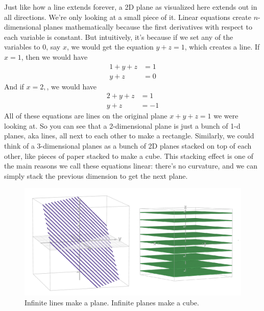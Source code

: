 \documentclass[12pt]{scrartcl}
\begin{document}
Just like how a line extends forever, a 2D plane as visualized here extends out in all directions. We're only looking at a small piece of it. Linear equations create $n$-dimensional planes mathematically because the first derivatives with respect to each variable is constant. But intuitively, it's because if we set any of the variables to 0, say $x$, we would get the equation $y+z = 1$, which creates a line. If $x=1$, then we would have
\begin{align*}
    1 + y + z &= 1 \\
        y + z &= 0
\end{align*}
And if $x=2,$, we would have
\begin{align*}
    2 + y + z &= 1 \\
        y + z &= -1
\end{align*}
All of these equations are lines on the original plane $x+y+z=1$ we were looking at. So you can see that a 2-dimensional plane is just a bunch of 1-d planes, aka lines, all next to each other to make a rectangle. Similarly, we could think of a 3-dimensional planes as a bunch of 2D planes stacked on top of each other, like pieces of paper stacked to make a cube. This stacking effect is one of the main reasons we call these equations linear: there's no curvature, and we can simply stack the previous dimension to get the next plane.

\begin{figure}[H]
    \centering
    \includegraphics[scale=0.4]{Planes Make the Next Dimension.png}
    \caption*{Infinite lines make a plane. Infinite planes make a cube.}
\end{figure}
\end{document}
